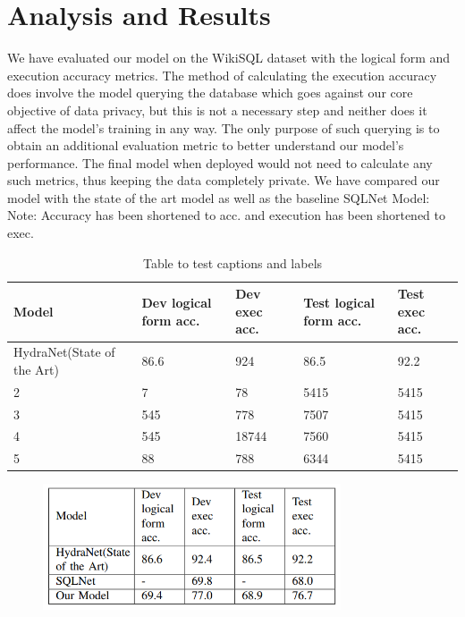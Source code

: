 \documentclass[12pt]{article}
\begin{document}
\section{Analysis and Results}


We have evaluated our model on the WikiSQL dataset with
the logical form and execution accuracy metrics. The method
of calculating the execution accuracy does involve the model
querying the database which goes against our core objective of
data privacy, but this is not a necessary step and neither does
it affect the model’s training in any way. The only purpose of
such querying is to obtain an additional evaluation metric to
better understand our model’s performance. The final model
when deployed would not need to calculate any such metrics,
thus keeping the data completely private.
We have compared our model with the state of the art model
as well as the baseline SQLNet Model:
Note: Accuracy has been shortened to acc. and execution
has been shortened to exec.
 

\begin{table}
\centering
 \begin{tabular}{| m{5cm} | m{2cm}| m{2cm} |m{2cm}| m{2cm} |} 
 \hline
 Model  & Dev logical form acc. & Dev exec acc. & Test logical form acc. & Test exec acc. \\ 
 \hline\hline
 HydraNet(State of the Art) & 86.6 & 924 & 86.5 & 92.2 \\ 
 \hline
 2 & 7 & 78 & 5415  & 5415 \\
 \hline
 3 & 545 & 778 & 7507 & 5415  \\
 \hline
 4 & 545 & 18744 & 7560  & 5415 \\
 \hline
 5 & 88 & 788 & 6344 & 5415  \\ 
 \hline
\end{tabular}
\caption{Table to test captions and labels}
\label{table:1}
\end{table}


\begin{figure}[H]
    \includegraphics[width=250pt]{result1}
    \label{fig:Model Architecture}
\end{figure}
\end{document}
